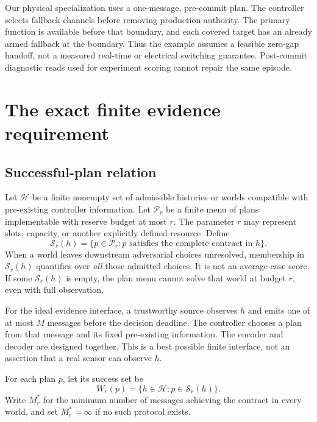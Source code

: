 \documentclass[11pt,a4paper]{article}
\theoremstyle{definition}\newtheorem{definition}{Definition}
\newcommand{\Hist}{\mathcal H}
\newcommand{\Plans}{\mathcal P}
\newcommand{\Succ}{\mathcal S}
\begin{document}
Our physical specialization uses a one-message, pre-commit plan. The controller selects fallback channels before removing production authority. The primary function is available before that boundary, and each covered target has an already armed fallback at the boundary. Thus the example assumes a feasible zero-gap handoff, not a measured real-time or electrical switching guarantee. Post-commit diagnostic reads used for experiment scoring cannot repair the same episode.

\section{The exact finite evidence requirement}
\label{sec:cover}
\subsection{Successful-plan relation}
Let $\Hist$ be a finite nonempty set of admissible histories or worlds compatible with pre-existing controller information. Let $\Plans_r$ be a finite menu of plans implementable with reserve budget at most $r$. The parameter $r$ may represent slots, capacity, or another explicitly defined resource. Define
\begin{equation}
\Succ_r(h)=\{p\in\Plans_r:p\text{ satisfies the complete contract in }h\}.
\label{eq:success}
\end{equation}
When a world leaves downstream adversarial choices unresolved, membership in $\Succ_r(h)$ quantifies over \emph{all} those admitted choices. It is not an average-case score. If some $\Succ_r(h)$ is empty, the plan menu cannot solve that world at budget $r$, even with full observation.

For the ideal evidence interface, a trustworthy source observes $h$ and emits one of at most $M$ messages before the decision deadline. The controller chooses a plan from that message and its fixed pre-existing information. The encoder and decoder are designed together. This is a best possible finite interface, not an assertion that a real sensor can observe $h$.

For each plan $p$, let its success set be
\begin{equation}
W_r(p)=\{h\in\Hist:p\in\Succ_r(h)\}.
\end{equation}
Write $M_r^*$ for the minimum number of messages achieving the contract in every world, and set $M_r^*=\infty$ if no such protocol exists.
\end{document}
